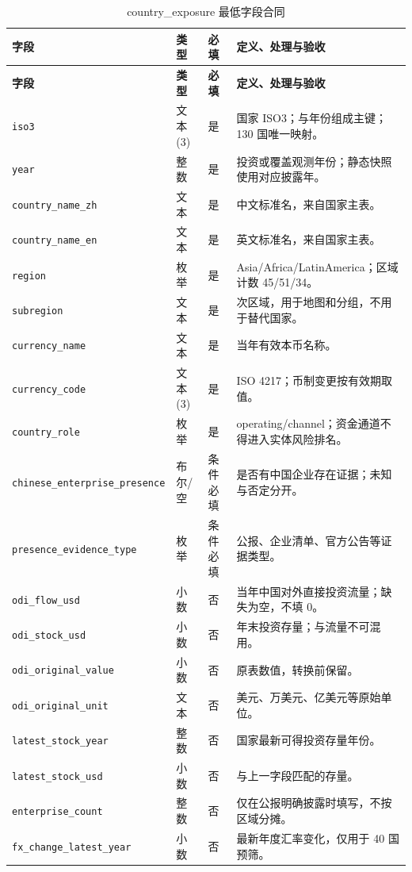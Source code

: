 \documentclass[UTF8,fontset=windows,12pt,openany]{ctexbook}
\newcommand{\Field}[1]{{\small\nolinkurl{#1}}}
\begin{document}
\begin{longtable}{p{3.5cm}p{2.3cm}p{2.2cm}p{5.3cm}}
\caption{country\_exposure 最低字段合同}\label{tab:dict-exposure}\\
\toprule
\textbf{字段} & \textbf{类型} & \textbf{必填} & \textbf{定义、处理与验收}\\
\midrule
\endfirsthead
\toprule \textbf{字段} & \textbf{类型} & \textbf{必填} & \textbf{定义、处理与验收}\\ \midrule
\endhead
\Field{iso3} & 文本(3) & 是 & 国家 ISO3；与年份组成主键；130 国唯一映射。\\
\Field{year} & 整数 & 是 & 投资或覆盖观测年份；静态快照使用对应披露年。\\
\Field{country_name_zh} & 文本 & 是 & 中文标准名，来自国家主表。\\
\Field{country_name_en} & 文本 & 是 & 英文标准名，来自国家主表。\\
\Field{region} & 枚举 & 是 & Asia/Africa/LatinAmerica；区域计数 45/51/34。\\
\Field{subregion} & 文本 & 是 & 次区域，用于地图和分组，不用于替代国家。\\
\Field{currency_name} & 文本 & 是 & 当年有效本币名称。\\
\Field{currency_code} & 文本(3) & 是 & ISO 4217；币制变更按有效期取值。\\
\Field{country_role} & 枚举 & 是 & operating/channel；资金通道不得进入实体风险排名。\\
\Field{chinese_enterprise_presence} & 布尔/空 & 条件必填 & 是否有中国企业存在证据；未知与否定分开。\\
\Field{presence_evidence_type} & 枚举 & 条件必填 & 公报、企业清单、官方公告等证据类型。\\
\Field{odi_flow_usd} & 小数 & 否 & 当年中国对外直接投资流量；缺失为空，不填 0。\\
\Field{odi_stock_usd} & 小数 & 否 & 年末投资存量；与流量不可混用。\\
\Field{odi_original_value} & 小数 & 否 & 原表数值，转换前保留。\\
\Field{odi_original_unit} & 文本 & 否 & 美元、万美元、亿美元等原始单位。\\
\Field{latest_stock_year} & 整数 & 否 & 国家最新可得投资存量年份。\\
\Field{latest_stock_usd} & 小数 & 否 & 与上一字段匹配的存量。\\
\Field{enterprise_count} & 整数 & 否 & 仅在公报明确披露时填写，不按区域分摊。\\
\Field{fx_change_latest_year} & 小数 & 否 & 最新年度汇率变化，仅用于 40 国预筛。\\

\end{longtable}
\end{document}
